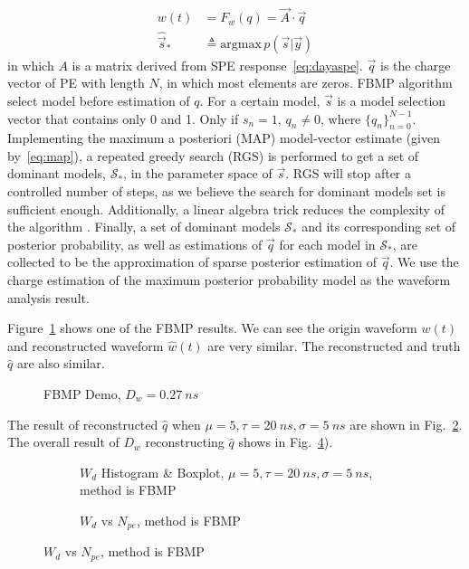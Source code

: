 \begin{align}
    w(t) &= F_{w}(q) = \vec{A}\cdot \vec{q} \label{eq:fbmpmodel} \\
    \hat{\vec{s}}_{*} &\triangleq \mathrm{argmax}\,p(\vec{s}|\vec{y}) \label{eq:map}
\end{align}
in which $A$ is a matrix derived from SPE response~\eqref{eq:dayaspe}. $\vec{q}$ is the charge vector of PE with length $N$, in which most elements are zeros. FBMP algorithm select model before estimation of $q$. For a certain model, $\vec{s}$ is a model selection vector that contains only 0 and 1. Only if $s_{n}=1$, $q_{n}\neq0$, where $\{q_{n}\}_{n=0}^{N-1}$. Implementing the maximum a posteriori (MAP) model-vector estimate (given by~\eqref{eq:map}), a repeated greedy search (RGS) is performed to get a set of dominant models, $\mathcal{S}_{*}$, in the parameter space of $\vec{s}$. RGS will stop after a controlled number of steps, as we believe the search for dominant models set is sufficient enough. Additionally, a linear algebra trick reduces the complexity of the algorithm \cite{schniter_fast_nodate}. Finally, a set of dominant models $\mathcal{S}_{*}$ and its corresponding set of posterior probability, as well as estimations of $\vec{q}$ for each model in $\mathcal{S}_{*}$, are collected to be the approximation of sparse posterior estimation of $\vec{q}$. We use the charge estimation of the maximum posterior probability model as the waveform analysis result. 

Figure~\ref{fig:fbmp} shows one of the FBMP results. We can see the origin waveform $w(t)$ and reconstructed waveform $\hat{w}(t)$ are very similar. The reconstructed and truth $\hat{q}$ are also similar. 

\begin{figure}[H]
    \centering
    \scalebox{0.4}{}
    \caption{\label{fig:fbmp} FBMP Demo, $D_w = \SI{0.27}{ns}$}
\end{figure}

The result of reconstructed $\hat{q}$ when $\mu=5, \tau=\SI{20}{ns}, \sigma=\SI{5}{ns}$ are shown in Fig.~\ref{fig:fbmp-hist}. The overall result of $D_w$ reconstructing $\hat{q}$ shows in Fig.~\ref{fig:fbmp-npe}). 

\begin{figure}[H]
\begin{minipage}[t]{.5\textwidth}
\begin{figure}[H]
    \centering
    \resizebox{\textwidth}{!}{}
    \caption{\label{fig:fbmp-hist} $W_{d}$ Histogram \& Boxplot, $\mu=5, \tau=\SI{20}{ns}, \sigma=\SI{5}{ns}$, method is FBMP}
\end{figure}
\end{minipage}
\begin{minipage}[t]{.5\textwidth}
\begin{figure}[H]
    \centering
    \resizebox{\textwidth}{!}{}
    \caption{\label{fig:fbmp-npe} $W_{d}$ vs $N_{pe}$, method is FBMP}
\end{figure}
\end{minipage}
\end{figure}

